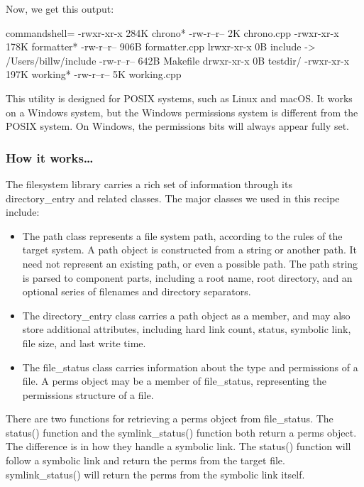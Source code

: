 \begin{itemize}
Now, we get this output:

\begin{tcblisting}{commandshell={}}
-rwxr-xr-x 284K chrono*
-rw-r--r--   2K chrono.cpp
-rwxr-xr-x 178K formatter*
-rw-r--r-- 906B formatter.cpp
lrwxr-xr-x   0B include -> /Users/billw/include
-rw-r--r-- 642B Makefile
drwxr-xr-x   0B testdir/
-rwxr-xr-x 197K working*
-rw-r--r--   5K working.cpp
\end{tcblisting}

\begin{tcolorbox}[colback=webgreen!5!white,colframe=webgreen!75!black,title=Note]
This utility is designed for POSIX systems, such as Linux and macOS. It works on a Windows system, but the Windows permissions system is different from the POSIX system. On Windows, the permissions bits will always appear fully set.
\end{tcolorbox}

\end{itemize}

\subsubsection{How it works…}

The filesystem library carries a rich set of information through its directory\_entry and related classes. The major classes we used in this recipe include:

\begin{itemize}
\item 
The path class represents a file system path, according to the rules of the target system. A path object is constructed from a string or another path. It need not represent an existing path, or even a possible path. The path string is parsed to component parts, including a root name, root directory, and an optional series of filenames and directory separators.

\item 
The directory\_entry class carries a path object as a member, and may also store additional attributes, including hard link count, status, symbolic link, file size, and last write time.

\item 
The file\_status class carries information about the type and permissions of a file. A perms object may be a member of file\_status, representing the permissions structure of a file.
\end{itemize}

There are two functions for retrieving a perms object from file\_status. The status() function and the symlink\_status() function both return a perms object. The difference is in how they handle a symbolic link. The status() function will follow a symbolic link and return the perms from the target file. symlink\_status() will return the perms from the symbolic link itself.


